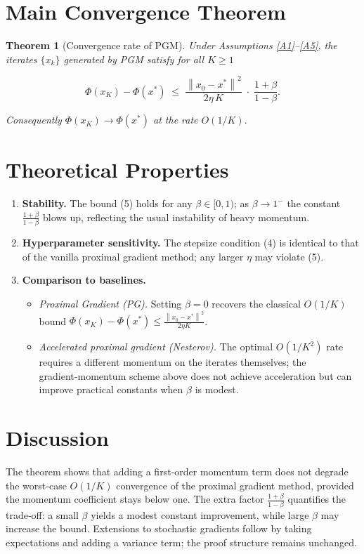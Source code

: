 \documentclass[11pt]{article}
\newtheorem{theorem}{Theorem}
\newcommand{\norm}[1]{\left\lVert #1\right\rVert}
\begin{document}
\vspace{0.2cm}
\section*{Main Convergence Theorem}
\begin{theorem}[Convergence rate of PGM]\label{thm:main}
Under Assumptions \ref{A1}–\ref{A5}, the iterates $\{x_{k}\}$ generated by PGM satisfy for all $K\ge 1$  

\[
\Phi(x_{K})-\Phi(x^{*})\;\le\;\frac{\norm{x_{0}-x^{*}}^{2}}{2\eta\,K}\;\cdot\;\frac{1+\beta}{1-\beta}. \tag{5}
\]

Consequently $\Phi(x_{K})\to \Phi(x^{*})$ at the rate $O(1/K)$. 
\end{theorem}

\vspace{0.2cm}
\section*{Theoretical Properties}
\begin{enumerate}[label=\textbf{P\arabic*.}, leftmargin=*, itemsep=2pt]
\item \textbf{Stability.} The bound (5) holds for any $\beta\in[0,1)$; as $\beta\to 1^{-}$ the constant $\frac{1+\beta}{1-\beta}$ blows up, reflecting the usual instability of heavy momentum.
\item \textbf{Hyperparameter sensitivity.} The stepsize condition (4) is identical to that of the vanilla proximal gradient method; any larger $\eta$ may violate (5).
\item \textbf{Comparison to baselines.}
\begin{itemize}
\item \emph{Proximal Gradient (PG).} Setting $\beta=0$ recovers the classical $O(1/K)$ bound $\Phi(x_{K})-\Phi(x^{*})\le\frac{\norm{x_{0}-x^{*}}^{2}}{2\eta K}$.
\item \emph{Accelerated proximal gradient (Nesterov).} The optimal $O(1/K^{2})$ rate requires a different momentum on the iterates themselves; the gradient‑momentum scheme above does not achieve acceleration but can improve practical constants when $\beta$ is modest.
\end{itemize}
\end{enumerate}

\vspace{0.2cm}
\section*{Discussion}
The theorem shows that adding a first‑order momentum term does not degrade the worst‑case $O(1/K)$ convergence of the proximal gradient method, provided the momentum coefficient stays below one. The extra factor $\frac{1+\beta}{1-\beta}$ quantifies the trade‑off: a small $\beta$ yields a modest constant improvement, while large $\beta$ may increase the bound. Extensions to stochastic gradients follow by taking expectations and adding a variance term; the proof structure remains unchanged.
\end{document}
